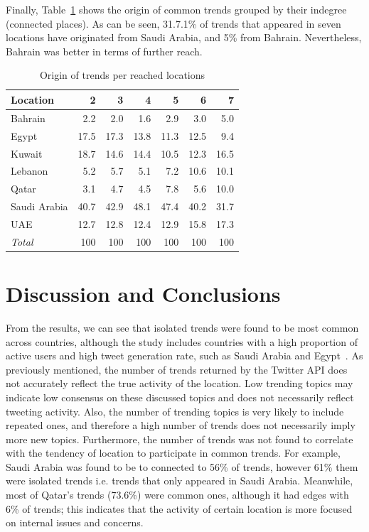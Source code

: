 \documentclass{llncs}
\begin{document}
Finally, Table~\ref{tbl:trendorigin} shows the origin of common trends
grouped by their indegree (connected places). As can be seen, 31.7.1\%
of trends that appeared in seven locations have originated from Saudi
Arabia, and 5\% from Bahrain. Nevertheless, Bahrain was better in
terms of further reach.

\begin{table}[!h]
\centering
\caption{Origin of trends per reached locations}
\begin{tabular}{@{}lrrrrrr@{}}
\toprule
Location & 2 & 3 & 4 & 5 & 6 & 7 \\ 
\midrule
Bahrain &           2.2 &   2.0 &   1.6 &   2.9 &   3.0 &    5.0 \\
Egypt &            17.5 & 17.3 & 13.8 & 11.3 & 12.5 &    9.4\\
Kuwait &          18.7 & 14.6  & 14.4 & 10.5 & 12.3 & 16.5\\
Lebanon &         5.2 &   5.7 &    5.1 &   7.2 & 10.6 & 10.1 \\
Qatar &              3.1 &   4.7 &    4.5 &   7.8 &   5.6 & 10.0 \\
Saudi Arabia & 40.7 & 42.9 &  48.1 & 47.4 & 40.2 & 31.7 \\
UAE &              12.7 & 12.8 &  12.4 & 12.9 & 15.8 & 17.3 \\
\midrule
{\emph{Total}} & 100 & 100 & 100 & 100 & 100 &  100 \\
\bottomrule
\end{tabular}
\label{tbl:trendorigin}
\end{table}

\vspace{-1em}
\section{Discussion and Conclusions}\label{dissconc}

From the results, we can see that isolated trends were found to be
most common across countries, although the study includes countries
with a high proportion of active users and high tweet generation rate,
such as Saudi Arabia and Egypt~\cite{Salem2017}. As previously
mentioned, the number of trends returned by the Twitter API does not
accurately reflect the true activity of the location. Low trending
topics may indicate low consensus on these discussed topics and does
not necessarily reflect tweeting activity. Also, the number of
trending topics is very likely to include repeated ones, and therefore
a high number of trends does not necessarily imply more new
topics. Furthermore, the number of trends was not found to correlate
with the tendency of location to participate in common trends. For
example, Saudi Arabia was found to be to connected to 56\% of trends,
however 61\% them were isolated trends i.e. trends that only appeared
in Saudi Arabia. Meanwhile, most of Qatar's trends (73.6\%) were
common ones, although it had edges with 6\% of trends; this indicates
that the activity of certain location is more focused on internal
issues and concerns.
\end{document}
